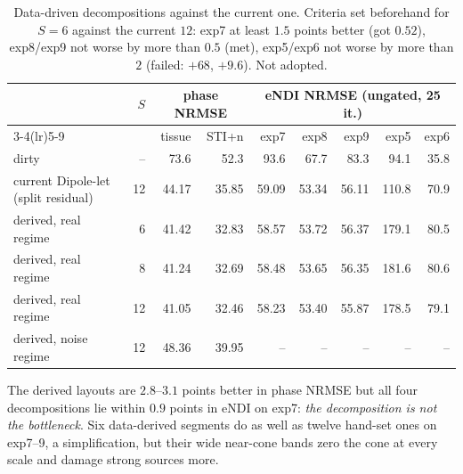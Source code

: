 \documentclass[11pt]{article}
\begin{document}
\begin{table}[h]\centering\small
\begin{tabular}{@{}lrrrrrrrr@{}}
\toprule
 & $S$ & \multicolumn{2}{c}{phase NRMSE} & \multicolumn{5}{c}{eNDI NRMSE (ungated, 25 it.)} \\
\cmidrule(lr){3-4}\cmidrule(lr){5-9}
 & & tissue & STI+n & exp7 & exp8 & exp9 & exp5 & exp6 \\
\midrule
dirty & -- & 73.6 & 52.3 & 93.6 & 67.7 & 83.3 & 94.1 & 35.8 \\
current Dipole-let (split residual) & 12 & 44.17 & 35.85 & 59.09 & 53.34 & 56.11 & 110.8 & 70.9 \\
derived, real regime & 6 & 41.42 & 32.83 & 58.57 & 53.72 & 56.37 & 179.1 & 80.5 \\
derived, real regime & 8 & 41.24 & 32.69 & 58.48 & 53.65 & 56.35 & 181.6 & 80.6 \\
derived, real regime & 12 & 41.05 & 32.46 & 58.23 & 53.40 & 55.87 & 178.5 & 79.1 \\
derived, noise regime & 12 & 48.36 & 39.95 & -- & -- & -- & -- & -- \\
\bottomrule
\end{tabular}
\caption{Data-driven decompositions against the current one. Criteria set beforehand for $S=6$ against the current $12$: exp7 at least $1.5$ points better (got $0.52$), exp8/exp9 not worse by more than $0.5$ (met), exp5/exp6 not worse by more than $2$ (failed: $+68$, $+9.6$). Not adopted.}\label{tab:design}
\end{table}
The derived layouts are $2.8$--$3.1$ points better in phase NRMSE but all four decompositions lie within $0.9$ points in eNDI on exp7: \emph{the decomposition is not the bottleneck}. Six data-derived segments do as well as twelve hand-set ones on exp7--9, a simplification, but their wide near-cone bands zero the cone at every scale and damage strong sources more.

\end{document}
